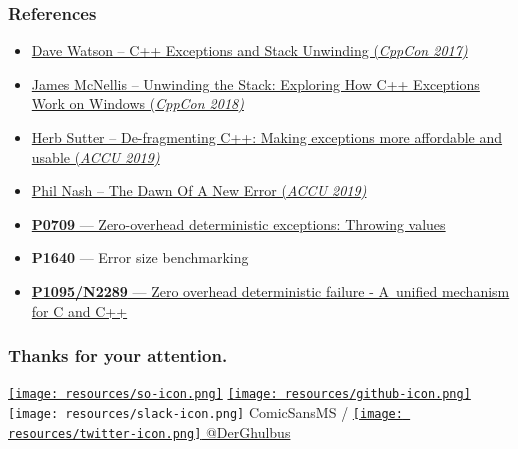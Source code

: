 \documentclass[aspectratio=169]{beamer}
\begin{document}
\begin{frame}
\frametitle{References}

\begin{itemize}
\item \href{https://www.youtube.com/watch?v=_Ivd3qzgT7U}{Dave Watson -- C++ Exceptions and Stack Unwinding (\em{CppCon 2017})}
\item \href{https://www.youtube.com/watch?v=COEv2kq_Ht8}{James McNellis -- Unwinding the Stack: Exploring How C++ Exceptions Work on Windows (\em{CppCon 2018})}
\item \href{https://www.youtube.com/watch?v=os7cqJ5qlzo}{Herb Sutter -- De-fragmenting C++: Making exceptions more affordable and usable (\em{ACCU 2019})}
\item \href{https://www.youtube.com/watch?v=2Jhfubg9yvA}{Phil Nash -- The Dawn Of A New Error (\em{ACCU 2019})}
\item \href{https://wg21.link/p0709}{\textbf{P0709} --- Zero-overhead deterministic exceptions: Throwing values}
\item \textbf{P1640} --- Error size benchmarking
\item \href{https://wg21.link/p1095}{\textbf{P1095/N2289} --- Zero overhead deterministic failure - A~unified mechanism for C and C++}

\end{itemize}

\end{frame}

\begin{frame}
  \frametitle{Thanks for your attention.}

  \href{https://stackoverflow.com/users/577603/comicsansms}{\texttt{[image: resources/so-icon.png]}}
  \href{https://github.com/ComicSansMS}{\texttt{[image: resources/github-icon.png]}}
  \texttt{[image: resources/slack-icon.png]} ComicSansMS /
  \href{https://twitter.com/DerGhulbus/}{\texttt{[image: resources/twitter-icon.png]} @DerGhulbus}

\end{frame}
\end{document}

